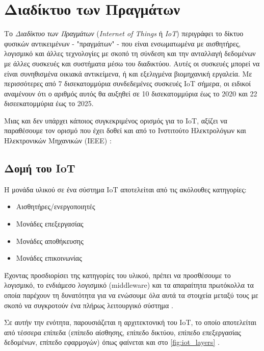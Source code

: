 \section{Διαδίκτυο των Πραγμάτων}
\label{sec:theory_iot}

Το \textit{Διαδίκτυο των Πραγμάτων} (\textit{Internet of Things} ή \textit{IoT}) περιγράφει το δίκτυο φυσικών αντικειμένων - "πραγμάτων" - που είναι ενσωματωμένα με αισθητήρες, λογισμικό και άλλες τεχνολογίες με σκοπό τη σύνδεση και την ανταλλαγή δεδομένων με άλλες συσκευές και συστήματα μέσω του διαδικτύου. Αυτές οι συσκευές μπορεί να είναι συνηθισμένα οικιακά αντικείμενα, ή και εξελιγμένα βιομηχανική εργαλεία. Με περισσότερες από 7 δισεκατομμύρια συνδεδεμένες συσκευές IoT σήμερα, οι ειδικοί αναμένουν ότι ο αριθμός αυτός θα αυξηθεί σε 10 δισεκατομμύρια έως το 2020 και 22 δισεεκατομμύρια έως το 2025.

Μιας και δεν υπάρχει κάποιος συγκεκριμένος ορισμός για το IoT, αξίζει να παραθέσουμε τον ορισμό που έχει δοθεί και από το Ινστιτούτο Ηλεκτρολόγων και Ηλεκτρονικών Μηχανικών (IEEE) :

 \cite{bib:chebudie_2014}

\subsection{Δομή του IoT}
\label{subsec:structure}

Η μονάδα υλικού σε ένα σύστημα IoT αποτελείται από τις ακόλουθες κατηγορίες:

\begin{itemize}
	\item Αισθητήρες/ενεργοποιητές
	\item Μονάδες επεξεργασίας
	\item Μονάδες αποθήκευσης
	\item Μονάδες επικοινωνίας
\end{itemize}

Έχοντας προσδιορίσει της κατηγορίες του υλικού, πρέπει να προσθέσουμε το λογισμικό, το ενδιάμεσο λογισμικό (middleware) και τα απαραίτητα πρωτόκολλα τα οποία παρέχουν τη δυνατότητα για να ενώσουμε όλα αυτά τα στοιχεία μεταξύ τους με σκοπό να συγκροτούν ένα πλήρως λειτουργικό σύστημα \cite{bib:chebudie_2014}.

Σε αυτήν την ενότητα, παρουσιάζεται η αρχιτεκτονική του IoT, το οποίο αποτελείται από τέσσερα επίπεδα (επίπεδο αίσθησης, επίπεδο δικτύου, επίπεδο επεξεργασίας δεδομένων, επίπεδο εφαρμογών) όπως φαίνεται και στο \autoref{fig:iot_layers} \cite{bib:kumar_2018}.

